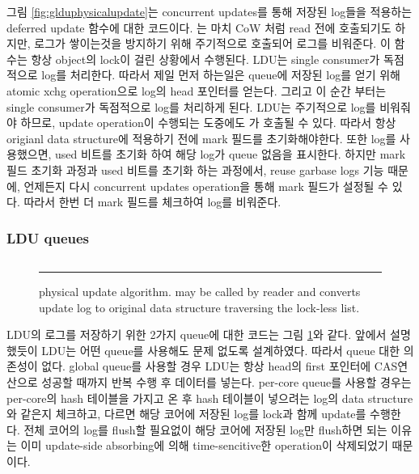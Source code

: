 \ifkor
그림 \ref{fig:glduphysicalupdate}는 concurrent updates를 통해 저장된 log들을 적용하는 deferred
update 함수에 대한 코드이다.
는 마치 CoW 처럼 read 전에 호출되기도 하지만, 로그가 쌓이는것을 방지하기 위해 주기적으로
호출되어 로그를 비워준다.
이 함수는 항상 object의 lock이 걸린 상황에서 수행된다. 
LDU는 single consumer가 독점적으로 log를 처리한다.
따라서 제일 먼저 하는일은 queue에 저장된 log를 얻기 위해 atomic xchg operation으로 log의 head 포인터를
얻는다.
그리고 이 순간 부터는 single consumer가 독점적으로 log를 처리하게 된다.
LDU는 주기적으로 log를 비워줘야 하므로, update operation이 수행되는 도중에도 가
호출될 수 있다.
따라서 항상 origianl data structure에 적용하기 전에 mark 필드를 초기화해야한다.
또한 log를 사용했으면, used 비트를 초기화 하여 해당 log가 queue 없음을 표시한다.
하지만 mark 필드 초기화 과정과 used 비트를 초기화 하는 과정에서, reuse garbase logs 기능 때문에,
언제든지 다시 concurrent updates operation을 통해 mark 필드가 설정될 수 있다.
따라서 한번 더 mark 필드를 체크하여 log를 비워준다.
\else



\fi

\ifkorthesis
\subsubsection{LDU queues}
\begin{figure}[tb!]
\inputminted[linenos,fontsize=\footnotesize, tabsize=2]{c}{src/ldu_queue.c}
\rule{\columnwidth}{0.5pt}
\vspace{-\baselineskip}
\caption{ physical update algorithm.  may be
 called by reader and converts update log to original data structure
 traversing the lock-less list.}
\label{fig:lduqueue}
\end{figure}

LDU의 로그를 저장하기 위한 2가지 queue에 대한 코드는 그림 \ref{fig:lduqueue}와 같다. 
앞에서 설명했듯이 LDU는 어떤 queue를 사용해도 문제 없도록 설계하였다.
따라서 queue 대한 의존성이 없다.
global queue를 사용할 경우 LDU는 항상 head의 first 포인터에 CAS연산으로 성공할 때까지 반복 수행 후 데이터를 넣는다. 
per-core queue를 사용할 경우는 per-core의 hash 테이블을 가지고 온 후 hash 테이블이 넣으려는 log의
data structure와 같은지 체크하고, 다르면 해당 코어에 저장된 log를 lock과 함께 update를 수행한다.
전체 코어의 log를 flush할 필요없이 해당 코어에 저장된 log만 flush하면 되는 이유는 이미 update-side
absorbing에 의해 time-sencitive한 operation이 삭제되었기 때문이다.
\fi


